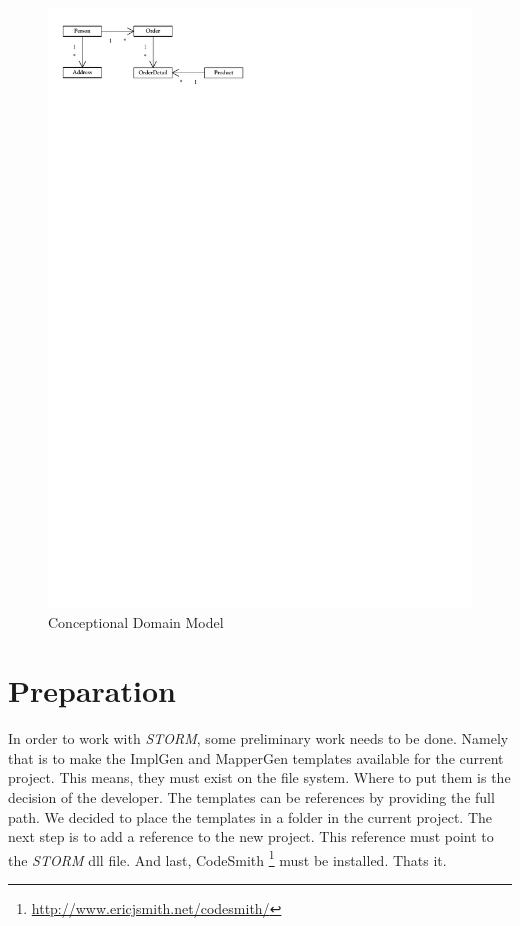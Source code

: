 		\begin{figure}[htb]
			\begin{center}
				\includegraphics{./files/inc/figures/DesignConceptModel}
				\caption{\label{fig:designConceptModel}Conceptional Domain Model}
			\end{center}
		\end{figure}
		
	\section{Preparation}
		In order to work with \textit{STORM}, some preliminary work needs to be done.
		Namely that is to make the ImplGen and MapperGen templates available for the current
		project. This means, they must exist on the file system. Where to put them is
		the decision of the developer. The templates can be references by providing
		the full path. We decided to place the templates in a folder in the current project.
		The next step is to add a reference to the	new project. This reference must point to 
		the \textit{STORM} dll file. And last, CodeSmith \footnote{\url{http://www.ericjsmith.net/codesmith/}}
		must be installed. Thats it.
	

